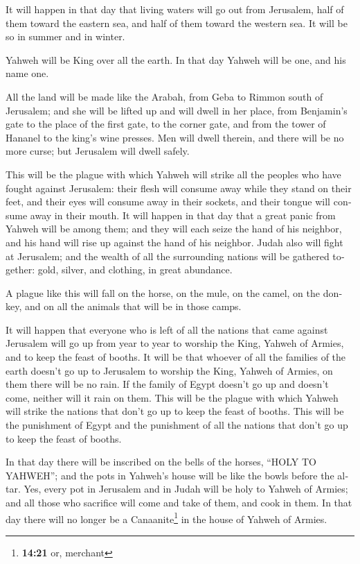 \begin{paracol}{2}
\begin{otherlanguage}{english}
 It will happen in that day that living waters will go out
from Jerusalem, half of them toward the eastern sea, and half of them
toward the western sea. It will be so in summer and in winter.

 Yahweh will be King over all the earth. In that day
Yahweh will be one, and his name one.

 All the land will be made like the Arabah, from Geba to
Rimmon south of Jerusalem; and she will be lifted up and will dwell in
her place, from Benjamin's gate to the place of the first gate, to the
corner gate, and from the tower of Hananel to the king's wine presses.
 Men will dwell therein, and there will be no more curse;
but Jerusalem will dwell safely.

 This will be the plague with which Yahweh will strike
all the peoples who have fought against Jerusalem: their flesh will
consume away while they stand on their feet, and their eyes will consume
away in their sockets, and their tongue will consume away in their
mouth.  It will happen in that day that a great panic
from Yahweh will be among them; and they will each seize the hand of his
neighbor, and his hand will rise up against the hand of his neighbor.
 Judah also will fight at Jerusalem; and the wealth of
all the surrounding nations will be gathered together: gold, silver, and
clothing, in great abundance.

 A plague like this will fall on the horse, on the mule,
on the camel, on the donkey, and on all the animals that will be in
those camps.

 It will happen that everyone who is left of all the
nations that came against Jerusalem will go up from year to year to
worship the King, Yahweh of Armies, and to keep the feast of booths.
 It will be that whoever of all the families of the earth
doesn't go up to Jerusalem to worship the King, Yahweh of Armies, on
them there will be no rain.  If the family of Egypt
doesn't go up and doesn't come, neither will it rain on them. This will
be the plague with which Yahweh will strike the nations that don't go up
to keep the feast of booths.  This will be the punishment
of Egypt and the punishment of all the nations that don't go up to keep
the feast of booths.

 In that day there will be inscribed on the bells of the
horses, ``HOLY TO YAHWEH''; and the pots in Yahweh's house will be like
the bowls before the altar.  Yes, every pot in Jerusalem
and in Judah will be holy to Yahweh of Armies; and all those who
sacrifice will come and take of them, and cook in them. In that day
there will no longer be a Canaanite\footnote{\textbf{14:21} or, merchant}
in the house of Yahweh of Armies. \end{otherlanguage}
\end{paracol}
